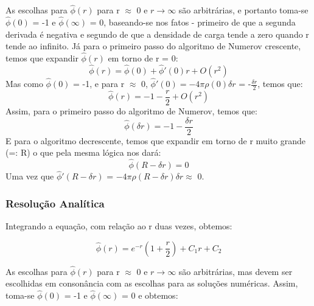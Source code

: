 \documentclass[12pt, a4paper]{article} %
\begin{document}
        As escolhas para $\hat{\phi}(r)$ para r $\approx$ 0 e $r \to \infty$ s\~ao arbitr\'arias, e portanto toma-se $\hat{\phi}(0)$ = -1 e $\hat{\phi}(\infty)$ = 0, baseando-se nos fatos - primeiro de que a segunda derivada \'e negativa e segundo de que a densidade de carga tende a zero quando r tende ao infinito.
        J\'a para o primeiro passo do algoritmo de Numerov crescente, temos que expandir $\hat{\phi}(r)$ em torno de r = 0:
        \begin{equation*}
            \hat{\phi}(r) = \hat{\phi}(0) + \hat{\phi}'(0)r + O(r^{2})
        \end{equation*}
        Mas como $\hat{\phi}(0)$ = -1, e para r $\approx$ 0, $\hat{\phi}'(0) = -4\pi \rho(0)\delta r$ = -$\frac{\delta r}{2}$, temos que:
        \begin{equation*}
            \hat{\phi}(r) = -1 - \frac{r}{2} + O(r^{2})
        \end{equation*}
        Assim, para o primeiro passo do algoritmo de Numerov, temos que:
        \begin{equation*}
            \hat{\phi}(\delta r) = -1 - \frac{\delta r}{2}
        \end{equation*}
        E para o algoritmo decrescente, temos que expandir em torno de r muito grande (=: R) o que pela mesma l\'ogica nos dar\'a:
        \begin{equation*}
            \hat{\phi}(R - \delta r) = 0
        \end{equation*}
        Uma vez que $\hat{\phi}'(R - \delta r)$ = $-4\pi \rho(R - \delta r)\delta r \approx$  0.

        \subsubsection{Resolu\c{c}\~ao Anal\'itica}

            Integrando a equa\c{c}\~ao, com rela\c{c}\~ao ao r duas vezes, obtemos:

            \begin{equation*}
                \hat{\phi}(r) = e^{-r}\left(1 + \frac{r}{2}\right) + C_{1}r + C_{2}
            \end{equation*}

            As escolhas para $\hat{\phi}(r)$ para r $\approx$ 0 e $r \to \infty$ s\~ao arbitr\'arias, mas devem ser escolhidas em conson\^ancia com as escolhas para as solu\c{c}\~oes num\'ericas. Assim, toma-se $\hat{\phi}(0)$ = -1 e $\hat{\phi}(\infty)$ = 0 e obtemos:
\end{document}
